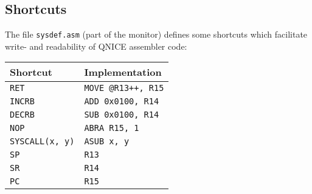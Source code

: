 \documentclass{leaflet}
\begin{document}
  \subsection{Shortcuts}
   The file \texttt{sysdef.asm} (part of the monitor) defines some shortcuts
   which facilitate write- and readability of QNICE assembler code:
   \begin{center}
    \begin{longtable}{|l|l|}
     \hline
      Shortcut&Implementation\\
     \hline
     \hline
      \texttt{RET}&\texttt{MOVE @R13++, R15}\\
      \texttt{INCRB}&\texttt{ADD 0x0100, R14}\\
      \texttt{DECRB}&\texttt{SUB 0x0100, R14}\\
      \texttt{NOP}&\texttt{ABRA R15, 1}\\
      \texttt{SYSCALL(x, y)}&\texttt{ASUB x, y}\\
     \hline
      \texttt{SP}&\texttt{R13}\\
      \texttt{SR}&\texttt{R14}\\
      \texttt{PC}&\texttt{R15}\\
     \hline
    \end{longtable}
   \end{center}
%
\end{document}

